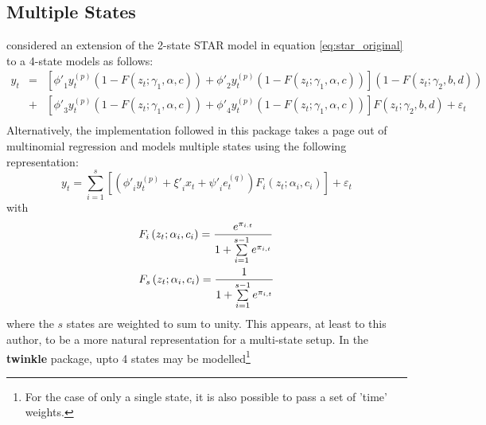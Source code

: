 \subsection{Multiple States}
\cite{Dijk1999} considered an extension of the 2-state STAR model in equation
\ref{eq:star_original} to a 4-state models as follows:
\begin{equation}\label{eq:mrstar_original}
\begin{aligned}
{y_t} &=& \left[ {{{\phi '}_1}y_t^{\left( p \right)}\left( {1 - F\left(
{{z_t};{\gamma _1},\alpha ,c} \right)} \right) + {{\phi '}_2}y_t^{\left( p
\right)}\left( {1 - F\left( {{z_t};{\gamma _1},\alpha ,c} \right)} \right)}
\right]\left( {1 - F\left( {{z_t};{\gamma _2},b,d} \right)} \right)\\
&+& \left[ {{{\phi '}_3}y_t^{\left( p \right)}\left( {1 - F\left(
{{z_t};{\gamma _1},\alpha ,c} \right)} \right) + {{\phi '}_4}y_t^{\left( p \right)}\left( {1 -
F\left( {{z_t};{\gamma _1},\alpha ,c} \right)} \right)} \right]F\left(
{{z_t};{\gamma _2},b,d} \right) + {\varepsilon _t}\\
\end{aligned}
\end{equation}
Alternatively, the implementation followed in this package takes a
page out of multinomial regression and models multiple states using the
following representation:
\begin{equation}\label{eq:mrstar_new}
{y_t} = \sum\limits_{i = 1}^s {\left[ {\left( {{{\phi '}_i}y_t^{\left( p \right)} + {{\xi '}_i}{x_t} + {{\psi '}_i}e_t^{\left( q \right)}} \right){F_i}\left( {{z_t};{\alpha _i},{c_i}} \right)} \right]}  + {\varepsilon _t}
\end{equation}
with
\begin{equation}
\begin{gathered}
  {F_i}\left( {{z_t};{\alpha _i},{c_i}} \right) = \frac{{{e^{{\pi _{i.t}}}}}}
{{1 + \sum\limits_{i = 1}^{s - 1} {{e^{{\pi _{i,t}}}}} }} \hfill \\
  {F_s}\left( {{z_t};{\alpha _i},{c_i}} \right) = \frac{1}
{{1 + \sum\limits_{i = 1}^{s - 1} {{e^{{\pi _{i,t}}}}} }} \hfill \\ 
\end{gathered}
\end{equation}
where the $s$ states are weighted to sum to unity. This appears, at least to
this author, to be a more natural representation for a multi-state setup. In the
\textbf{twinkle} package, upto 4 states may be modelled\footnote{For the case of
only a single state, it is also possible to pass a set of 'time' weights.}

